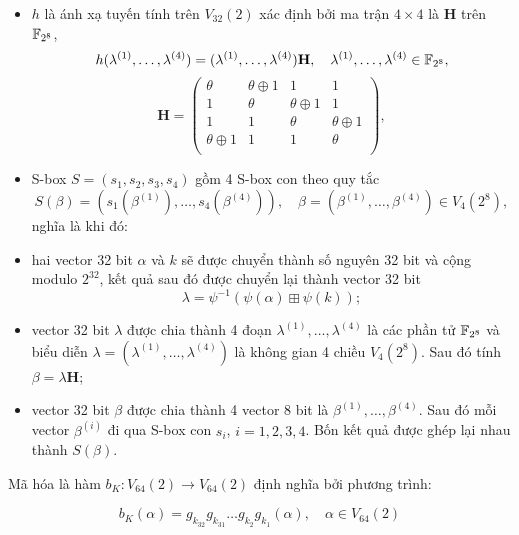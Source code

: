 \begin{itemize}
    \item $h$ là ánh xạ tuyến tính trên $V_{32}(2)$ xác định bởi ma trận $4 \times 4$ là $\mathbf{H}$ trên $\mathbb{F}_{2^8}$,
    \begin{equation*}
        h(\lambda^{(1)}, \ldots, \lambda^{(4)}) = (\lambda^{(1)}, \ldots, \lambda^{(4)}) \mathbf{H}, \quad \lambda^{(1)}, \ldots, \lambda^{(4)} \in \mathbb{F}_{2^8},
    \end{equation*}
    \begin{equation*}
        \mathbf{H} = \begin{pmatrix}
            \theta & \theta \oplus 1 & 1 & 1 \\
            1 & \theta & \theta \oplus 1 & 1 \\
            1 & 1 & \theta & \theta \oplus 1 \\
            \theta \oplus 1 & 1 & 1 & \theta \\
        \end{pmatrix},
    \end{equation*}
    \item S-box $S = (s_1, s_2, s_3, s_4)$ gồm 4 S-box con theo quy tắc
    \begin{equation*}
        S(\beta) = (s_1 (\beta^{(1)}), \ldots, s_4 (\beta^{(4)})), \quad \beta = (\beta^{(1)}, \ldots, \beta^{(4)}) \in V_4(2^8),
    \end{equation*}
    nghĩa là khi đó:
    \item hai vector 32 bit $\alpha$ và $k$ sẽ được chuyển thành số nguyên 32 bit và cộng modulo $2^{32}$, kết quả sau đó được chuyển lại thành vector 32 bit
    \begin{equation*}
        \lambda = \psi^{-1}(\psi(\alpha) \boxplus \psi(k));
    \end{equation*}
    \item vector 32 bit $\lambda$ được chia thành 4 đoạn $\lambda^{(1)}, \ldots, \lambda^{(4)}$ là các phần tử $\mathbb{F}_{2^8}$ và biểu diễn $\lambda = (\lambda^{(1)}, \ldots, \lambda^{(4)})$ là không gian 4 chiều $V_4(2^8)$. Sau đó tính $\beta = \lambda \mathbf{H}$;
    \item vector 32 bit $\beta$ được chia thành 4 vector 8 bit là $\beta^{(1)}, \ldots, \beta^{(4)}$. Sau đó mỗi vector $\beta^{(i)}$ đi qua S-box con $s_i$, $i = 1, 2, 3, 4$. Bốn kết quả được ghép lại nhau thành $S(\beta)$.
\end{itemize}

Mã hóa là hàm $b_K : V_{64}(2) \to V_{64}(2)$ định nghĩa bởi phương trình:

\begin{equation*}
    b_K(\alpha) = g_{k_32} g_{k_31} \ldots g_{k_2} g_{k_1} (\alpha), \quad \alpha \in V_{64}(2)
\end{equation*}

